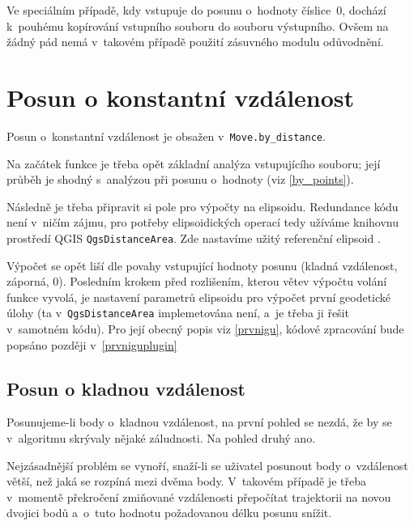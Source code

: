Ve speciálním případě, kdy vstupuje do posunu o~hodnoty číslice~0,
dochází k~pouhé\-mu kopírování vstupního
souboru do souboru výstupního. Ovšem na žádný pád nemá v~takovém případě použití zásuvného modulu
odůvodnění. 

\section{Posun o konstantní vzdálenost}
\label{by_distance}

Posun o~konstantní vzdálenost je obsažen v~{\tt Move.by\_distance}. 

Na začátek funkce je třeba opět základní analýza vstupujícího souboru; její průběh je shodný
s~analýzou při posunu o~hodnoty (viz \ref{by_points}). 

Následně je třeba připravit si pole pro výpočty na elipsoidu. Redundance kódu není v~ničím
zájmu, pro potřeby elipsoidických operací tedy užíváme knihovnu
prostředí QGIS {\tt QgsDistanceArea}. Zde nastavíme
užitý referenční elipsoid . 

Výpočet se opět liší dle povahy vstupující hodnoty posunu (kladná vzdálenost,
záporná, 0). Posledním krokem před rozlišením, kterou větev výpočtu volání funkce vyvolá, je nastavení
parametrů elipsoidu pro výpočet první geodetické úlohy (ta v~{\tt QgsDistanceArea} implemetována
není, a~je třeba ji řešit v~samotném kódu). Pro její obecný popis viz
\ref{prvnigu}, kódové zpracování bude popsáno později v~\ref{prvniguplugin} 

\subsection{Posun o kladnou vzdálenost}
\label{kladnavzdalenost}

Posunujeme-li body o~kladnou vzdálenost, na první pohled se nezdá, že by se v~algoritmu skrývaly
nějaké záludnosti. Na pohled druhý ano. 

Nejzásadnější problém se vynoří, snaží-li se uživatel posunout body o~vzdálenost větší, než
jaká se rozpíná mezi dvěma body. V~takovém případě je třeba v~momentě překročení zmiňované
vzdálenosti přepočítat trajektorii na novou dvojici bodů a~o~tuto hodnotu požadovanou
délku posunu snížit. 

